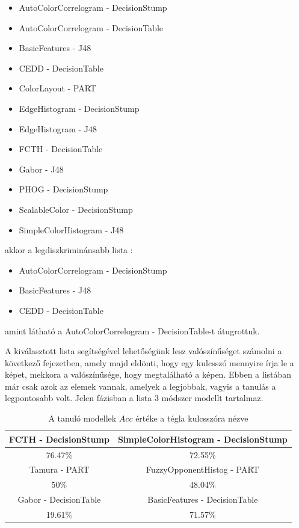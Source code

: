 \documentclass[12pt, a4paper, oneside]{book}
\theoremstyle{tetel}
\begin{document}
\begin{itemize}
  \item AutoColorCorrelogram - DecisionStump
  \item AutoColorCorrelogram - DecisionTable
  \item BasicFeatures - J48
  \item CEDD - DecisionTable
  \item ColorLayout - PART	
  \item EdgeHistogram - DecisionStump
  \item EdgeHistogram - J48
  \item FCTH - DecisionTable
  \item Gabor - J48
  \item PHOG - DecisionStump
  \item ScalableColor - DecisionStump
  \item SimpleColorHistogram - J48
\end{itemize}

akkor a legdiszkriminánsabb lista : 

\begin{itemize}
  \item AutoColorCorrelogram - DecisionStump
  \item BasicFeatures - J48
  \item CEDD - DecisionTable
\end{itemize}

amint látható a AutoColorCorrelogram - DecisionTable-t átugrottuk. 

	A kiválasztott lista segítségével lehetőségünk lesz valószínűséget számolni a következő fejezetben, amely majd eldönti, hogy egy kulcsszó mennyire írja le a képet, mekkora a valószínűsége, hogy megtalálható a képen. Ebben a listában már csak azok az elemek vannak, amelyek a legjobbak, vagyis a tanulás a legpontosabb volt. Jelen fázisban a lista 3 módszer modellt tartalmaz.

\begin{table}[h]
\begin{center}
\begin{tabular}{|c|c|}
\hline 
FCTH - DecisionStump & SimpleColorHistogram - DecisionStump  \\ 
\hline 
76.47\% & 72.55\%   \\ 
\hline 
Tamura - PART & FuzzyOpponentHistog - PART \\
\hline 
50\% & 48.04\%  \\
\hline
Gabor - DecisionTable & BasicFeatures - DecisionTable \\ 
\hline
19.61\%& 71.57\% \\
\hline
\end{tabular} 
\caption{{A tanuló modellek $Acc$ értéke a tégla kulcsszóra nézve}}
\label{accertekektegla}
\end{center}
\end{table}
\end{document}
